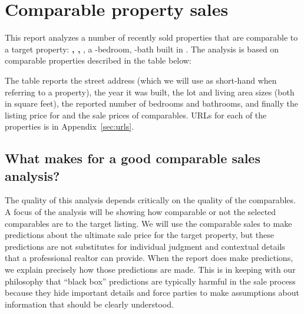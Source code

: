 \documentclass[
12pt, %
letterpaper, %
oneside, %
headinclude,footinclude, %
BCOR5mm, %
]{scrartcl}
\begin{document}


\section{Comparable property sales}
This report analyzes a number of recently sold properties that are comparable to a target property:
\textbf{\PropertyName{}, \PropertyCity{}, \PropertyState{}}, a \NumberOfBedrooms{}-bedroom, \NumberOfBaths{}-bath  \PropertyType{} built in \PropertyYearBuilt{}.
\TypeWarning{}
The analysis is based on \NumberOfComps{} comparable properties described in the table below:

\begin{small}

\end{small}

The table reports the street address (which we will use as short-hand when referring to a property), the year it was built, the lot and living area sizes (both in square feet), the reported number of bedrooms and bathrooms, and finally the listing price for \PropertyName{} and the sale prices of comparables.
URLs for each of the properties is in Appendix~\ref{sec:urls}.

\subsection{What makes for a good comparable sales analysis?}
The quality of this analysis depends critically on the quality of the comparables.
A focus of the analysis will be showing how comparable or not the selected comparables are to the target listing.
We will use the comparable sales to make predictions about the ultimate sale price for the target property, but these predictions are not substitutes for individual judgment and contextual details that a professional realtor can provide.
When the report does make predictions, we explain precisely how those predictions are made.
This is in keeping with our philosophy that ``black box'' predictions are typically harmful in the sale process because they hide important details and force parties to make assumptions about information that should be clearly understood.
\end{document}
